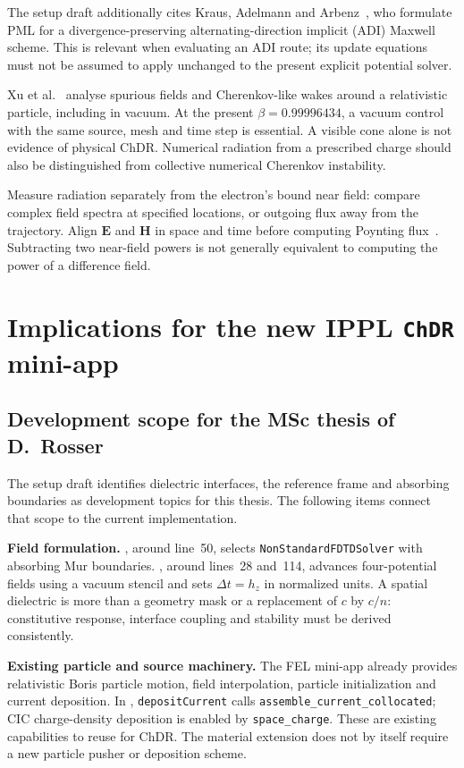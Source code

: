 \documentclass[11pt,a4paper]{article}
\newcommand{\code}[1]{\texttt{\small #1}}
\numberwithin{equation}{section}
\begin{document}
The setup draft additionally cites Kraus, Adelmann and
Arbenz~\cite{kraus2011adipml}, who formulate PML for a divergence-preserving
alternating-direction implicit (ADI) Maxwell scheme. This is relevant when
evaluating an ADI route; its update equations must not be assumed to apply
unchanged to the present explicit potential solver.

Xu et al.~\cite{xu2020numericalfields} analyse spurious fields and
Cherenkov-like wakes around a relativistic particle, including in vacuum.
At the present \(\beta=0.99996434\), a vacuum control with the same source,
mesh and time step is essential. A visible cone alone is not evidence
of physical ChDR. Numerical radiation from a prescribed charge should also
be distinguished from collective numerical Cherenkov instability.

Measure radiation separately from the electron's bound near field:
compare complex field spectra at specified locations, or outgoing flux
away from the trajectory. Align \(\mathbf E\) and \(\mathbf H\) in space
and time before computing Poynting flux~\cite{oskooi2010meep}.
Subtracting two near-field powers is not generally equivalent to computing
the power of a difference field.

\section{Implications for the new IPPL {\tt ChDR} mini-app}
\label{sec:ippl}

\subsection{Development scope for the MSc thesis of D.~Rosser}

The setup draft identifies dielectric interfaces, the reference frame and
absorbing boundaries as development topics for this thesis. The following
items connect that scope to the current implementation.

\textbf{Field formulation.}
, around line~50, selects
\code{NonStandardFDTDSolver} with absorbing Mur boundaries.
, around lines~28
and~114, advances four-potential fields using a vacuum stencil and sets
\(\Delta t=h_z\) in normalized units. A spatial dielectric is more than a
geometry mask or a replacement of \(c\) by \(c/n\): constitutive response,
interface coupling and stability must be derived consistently.

\textbf{Existing particle and source machinery.}
The FEL mini-app already provides relativistic Boris particle motion,
field interpolation, particle initialization and current deposition.
In , \code{depositCurrent}
calls \code{assemble\_current\_collocated}; CIC charge-density deposition
is enabled by \code{space\_charge}. These are existing capabilities to
reuse for ChDR. The material extension does not by itself require a new
particle pusher or deposition scheme.
\end{document}
